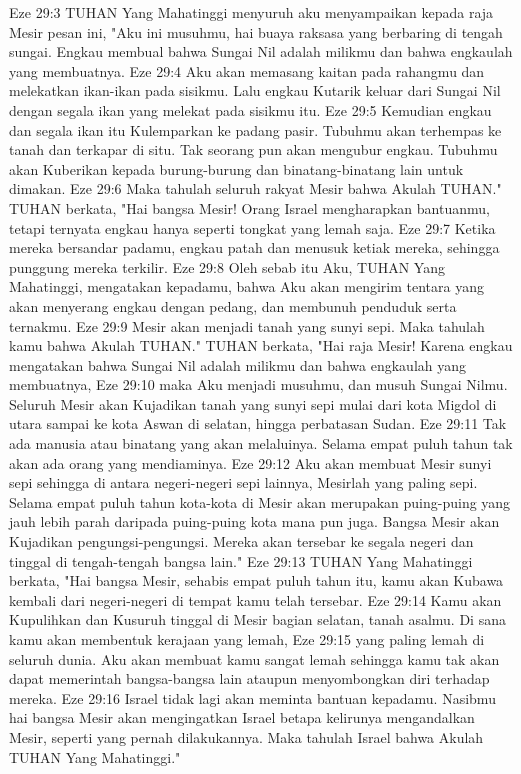 Eze 29:3  TUHAN Yang Mahatinggi menyuruh aku menyampaikan kepada raja Mesir pesan ini, "Aku ini musuhmu, hai buaya raksasa yang berbaring di tengah sungai. Engkau membual bahwa Sungai Nil adalah milikmu dan bahwa engkaulah yang membuatnya.
Eze 29:4  Aku akan memasang kaitan pada rahangmu dan melekatkan ikan-ikan pada sisikmu. Lalu engkau Kutarik keluar dari Sungai Nil dengan segala ikan yang melekat pada sisikmu itu.
Eze 29:5  Kemudian engkau dan segala ikan itu Kulemparkan ke padang pasir. Tubuhmu akan terhempas ke tanah dan terkapar di situ. Tak seorang pun akan mengubur engkau. Tubuhmu akan Kuberikan kepada burung-burung dan binatang-binatang lain untuk dimakan.
Eze 29:6  Maka tahulah seluruh rakyat Mesir bahwa Akulah TUHAN." TUHAN berkata, "Hai bangsa Mesir! Orang Israel mengharapkan bantuanmu, tetapi ternyata engkau hanya seperti tongkat yang lemah saja.
Eze 29:7  Ketika mereka bersandar padamu, engkau patah dan menusuk ketiak mereka, sehingga punggung mereka terkilir.
Eze 29:8  Oleh sebab itu Aku, TUHAN Yang Mahatinggi, mengatakan kepadamu, bahwa Aku akan mengirim tentara yang akan menyerang engkau dengan pedang, dan membunuh penduduk serta ternakmu.
Eze 29:9  Mesir akan menjadi tanah yang sunyi sepi. Maka tahulah kamu bahwa Akulah TUHAN." TUHAN berkata, "Hai raja Mesir! Karena engkau mengatakan bahwa Sungai Nil adalah milikmu dan bahwa engkaulah yang membuatnya,
Eze 29:10  maka Aku menjadi musuhmu, dan musuh Sungai Nilmu. Seluruh Mesir akan Kujadikan tanah yang sunyi sepi mulai dari kota Migdol di utara sampai ke kota Aswan di selatan, hingga perbatasan Sudan.
Eze 29:11  Tak ada manusia atau binatang yang akan melaluinya. Selama empat puluh tahun tak akan ada orang yang mendiaminya.
Eze 29:12  Aku akan membuat Mesir sunyi sepi sehingga di antara negeri-negeri sepi lainnya, Mesirlah yang paling sepi. Selama empat puluh tahun kota-kota di Mesir akan merupakan puing-puing yang jauh lebih parah daripada puing-puing kota mana pun juga. Bangsa Mesir akan Kujadikan pengungsi-pengungsi. Mereka akan tersebar ke segala negeri dan tinggal di tengah-tengah bangsa lain."
Eze 29:13  TUHAN Yang Mahatinggi berkata, "Hai bangsa Mesir, sehabis empat puluh tahun itu, kamu akan Kubawa kembali dari negeri-negeri di tempat kamu telah tersebar.
Eze 29:14  Kamu akan Kupulihkan dan Kusuruh tinggal di Mesir bagian selatan, tanah asalmu. Di sana kamu akan membentuk kerajaan yang lemah,
Eze 29:15  yang paling lemah di seluruh dunia. Aku akan membuat kamu sangat lemah sehingga kamu tak akan dapat memerintah bangsa-bangsa lain ataupun menyombongkan diri terhadap mereka.
Eze 29:16  Israel tidak lagi akan meminta bantuan kepadamu. Nasibmu hai bangsa Mesir akan mengingatkan Israel betapa kelirunya mengandalkan Mesir, seperti yang pernah dilakukannya. Maka tahulah Israel bahwa Akulah TUHAN Yang Mahatinggi."
